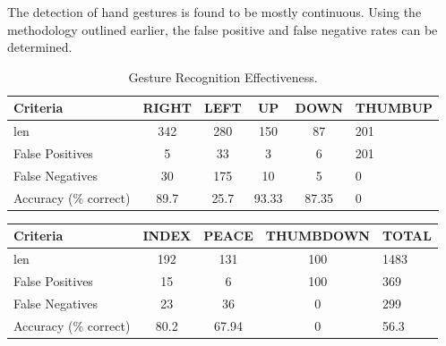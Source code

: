 The detection of hand gestures is found to be mostly continuous. Using the methodology outlined earlier, the false positive and false negative rates can be determined.

\begin{table}[!h]
  \raggedright
  \footnotesize%
    \begin{tabular}{lccccl}
      \toprule
      Criteria          & RIGHT & LEFT & UP & DOWN & THUMBUP \\
                                   
      \midrule
      len               &  342  & 280    &  150 & 87 & 201 \\%
      False Positives   &  5  & 33    &  3 & 6 &        201\\ 
      False Negatives        & 30  & 175    &  10 & 5 & 0\\ 
      \midrule
      Accuracy (\% correct)        & 89.7  & 25.7    &  93.33  & 87.35 & 0\\ 
      \bottomrule
    \end{tabular}
  \caption{Gesture Recognition Effectiveness.}
  \label{tab:recognition_effectiveness}
\end{table}

\begin{table}[!h]
  \raggedright
  \footnotesize%
    \begin{tabular}{lcccl}
      \toprule
      Criteria          & INDEX & PEACE & THUMBDOWN & TOTAL\\
                                   
      \midrule
      len                & 192 & 131 & 100&1483\\%
      False Positives   & 15 & 6 & 100&369\\ 
      False Negatives        & 23 & 36 & 0&299\\ 
      \midrule
      Accuracy (\% correct)        & 80.2 & 67.94 & 0& 56.3\\ 
      \bottomrule
    \end{tabular}
\end{table}

